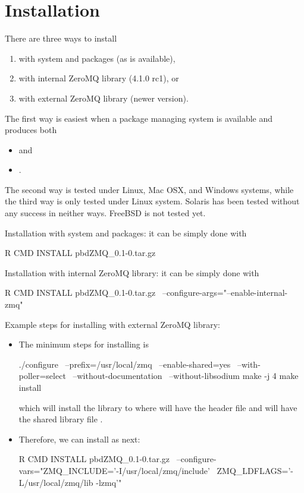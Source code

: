 \section[Installation]{Installation}
\label{sec:installation}

There are three ways to install 
\begin{enumerate}
\item with system  and  packages
      (as  is available),
\item with internal ZeroMQ library (4.1.0 rc1), or
\item with external ZeroMQ library (newer version).
\end{enumerate}
The first way is easiest when a package managing system is available and
produces both
\begin{itemize}
\item {} and
\item {}.
\end{itemize}
The second way is tested under Linux, Mac OSX, and Windows systems, while
the third way is only tested under Linux system. Solaris has been tested
without any success in neither ways. FreeBSD is not tested yet.

Installation with system  and  packages:
it can be simply done with
\begin{Command}
R CMD INSTALL pbdZMQ_0.1-0.tar.gz
\end{Command}

Installation with internal ZeroMQ library:
it can be simply done with
\begin{Command}
R CMD INSTALL pbdZMQ_0.1-0.tar.gz \
  --configure-args="--enable-internal-zmq"
\end{Command}

Example steps for installing with external ZeroMQ library:
\begin{itemize}
\item The minimum steps for installing  is
\begin{Command}
./configure \
   --prefix=/usr/local/zmq \
   --enable-shared=yes \
   --with-poller=select \
   --without-documentation \
   --without-libsodium
make -j 4
make install
\end{Command}
which will install the library to  where
 will have the header file  and
 will have the shared library file .

\item Therefore, we can install  as next:
\begin{Command}
R CMD INSTALL pbdZMQ_0.1-0.tar.gz \
  --configure-vars="ZMQ_INCLUDE='-I/usr/local/zmq/include' \
                    ZMQ_LDFLAGS='-L/usr/local/zmq/lib -lzmq'"
\end{Command}

\end{itemize}

